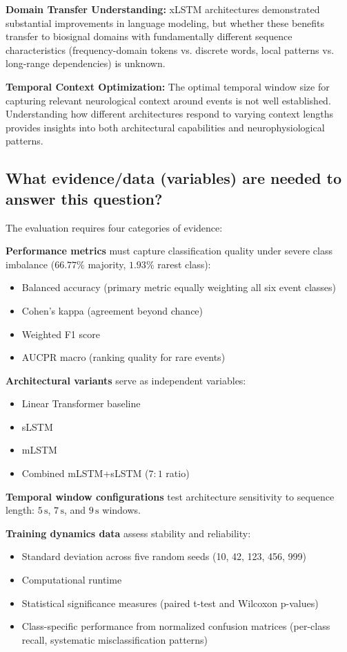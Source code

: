 \textbf{Domain Transfer Understanding:} \ac{xLSTM} architectures demonstrated substantial improvements in language modeling, but whether these benefits transfer to biosignal domains with fundamentally different sequence characteristics (frequency-domain tokens vs. discrete words, local patterns vs. long-range dependencies) is unknown.

\textbf{Temporal Context Optimization:} The optimal temporal window size for capturing relevant neurological context around events is not well established. Understanding how different architectures respond to varying context lengths provides insights into both architectural capabilities and neurophysiological patterns.

\subsection{What evidence/data (variables) are needed to answer this question?}

The evaluation requires four categories of evidence:

\textbf{Performance metrics} must capture classification quality under severe class imbalance ($66.77\%$ majority, $1.93\%$ rarest class):
\begin{itemize}
    \item Balanced accuracy (primary metric equally weighting all six event classes)
    \item Cohen's kappa (agreement beyond chance)
    \item Weighted F1 score
    \item AUCPR macro (ranking quality for rare events)
\end{itemize}

\textbf{Architectural variants} serve as independent variables:
\begin{itemize}
    \item Linear Transformer baseline
    \item \ac{sLSTM}
    \item \ac{mLSTM}
    \item Combined \ac{mLSTM}+\ac{sLSTM} ($7{:}1$ ratio)
\end{itemize}

\textbf{Temporal window configurations} test architecture sensitivity to sequence length: $5\,\text{s}$, $7\,\text{s}$, and $9\,\text{s}$ windows.

\textbf{Training dynamics data} assess stability and reliability:
\begin{itemize}
    \item Standard deviation across five random seeds (10, 42, 123, 456, 999)
    \item Computational runtime
    \item Statistical significance measures (paired t-test and Wilcoxon p-values)
    \item Class-specific performance from normalized confusion matrices (per-class recall, systematic misclassification patterns)
\end{itemize}

